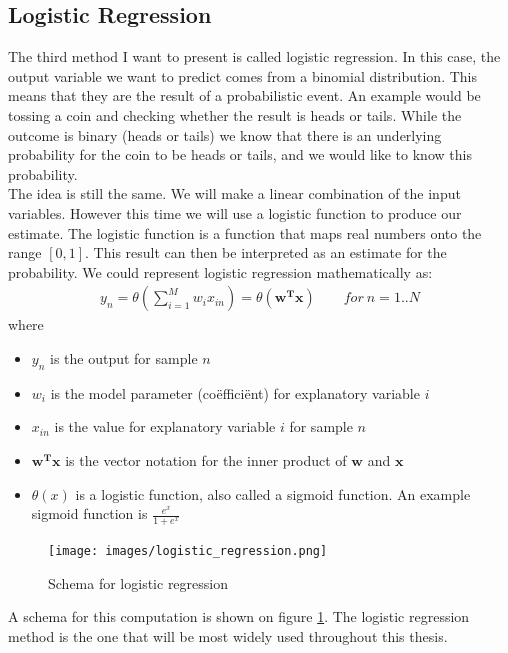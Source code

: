 \subsection{Logistic Regression}
\label{subsec:glm-logistic-regression}
The third method I want to present is called logistic regression\cite{caltechmachinelearning}\cite{wikilogistic}. In this case, the output variable we want to predict comes from a binomial distribution. This means that they are the result of a probabilistic event. An example would be tossing a coin and checking whether the result is heads or tails. While the outcome is binary (heads or tails) we know that there is an underlying probability for the coin to be heads or tails, and we would like to know this probability. \\
The idea is still the same. We will make a linear combination of the input variables. However this time we will use a logistic function to produce our estimate. The logistic function is a function that maps real numbers onto the range $[0,1]$. This result can then be interpreted as an estimate for the probability. We could represent logistic regression mathematically as:
\begin{equation}
\begin{split}
y_{n} = \theta(\sum_{i=1}^{M}w_{i}x_{in})= \theta(\bm{w^{T}x}) \qquad for\ n=1..N
\end{split}
\end{equation}
where
\begin{itemize}
	\item $y_{n}$ is the output for sample $n$
	\item $w_{i}$ is the model parameter (co\"effici\"ent) for explanatory variable $i$
	\item $x_{in}$ is the value for explanatory variable $i$ for sample $n$
	\item $\bm{w^{T}x}$ is the vector notation for the inner product of $\bm{w}$ and $\bm{x}$
	\item $\theta(x)$ is a logistic function, also called a sigmoid function. An example sigmoid function is $\frac{e^{x}}{1+e^{x}}$
\end{itemize}
\begin{figure}
	\centering
	\texttt{[image: images/logistic\_regression.png]}
	\caption{Schema for logistic regression}
	\label{fig:glm-logistic-regression}
\end{figure}
A schema for this computation is shown on figure \ref{fig:glm-logistic-regression}.
The logistic regression method is the one that will be most widely used throughout this thesis.

